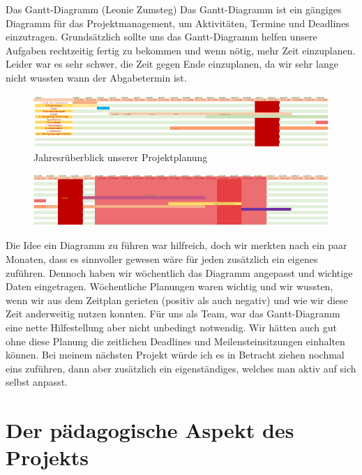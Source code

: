 \documentclass[a4paper, 12pt]{article}
\begin{document}
Das Gantt-Diagramm (Leonie Zumsteg)
Das Gantt-Diagramm ist ein gängiges Diagramm für das Projektmanagement, um Aktivitäten, Termine und Deadlines einzutragen. Grundsätzlich sollte uns das Gantt-Diagramm helfen unsere Aufgaben rechtzeitig fertig zu bekommen und wenn nötig, mehr Zeit einzuplanen. Leider war es sehr schwer, die Zeit gegen Ende einzuplanen, da wir sehr lange nicht wussten wann der Abgabetermin ist.

\begin{figure}
    \caption{Jahresr\"uberblick unserer Projektplanung}
    \centering
    \includegraphics[scale=0.6]{gantt1}
\end{figure}
\begin{figure}
    \centering
    \includegraphics[scale=0.6]{gantt2}
\end{figure}

Die Idee ein Diagramm zu führen war hilfreich, doch wir merkten nach ein paar Monaten, dass es sinnvoller gewesen wäre für jeden zusätzlich ein eigenes zuführen. Dennoch haben wir wöchentlich das Diagramm angepasst und wichtige Daten eingetragen. Wöchentliche Planungen waren wichtig und wir wussten, wenn wir aus dem Zeitplan gerieten (positiv als auch negativ) und wie wir diese Zeit anderweitig nutzen konnten.  Für uns als Team, war das Gantt-Diagramm eine nette Hilfestellung aber nicht unbedingt notwendig. Wir hätten auch gut ohne diese Planung die zeitlichen Deadlines und Meilensteinsitzungen einhalten können. Bei meinem nächsten Projekt würde ich es in Betracht ziehen nochmal eins zuführen, dann aber zusätzlich ein eigenständiges, welches man aktiv auf sich selbst anpasst. 

\section{Der pädagogische Aspekt des Projekts}
\end{document}
